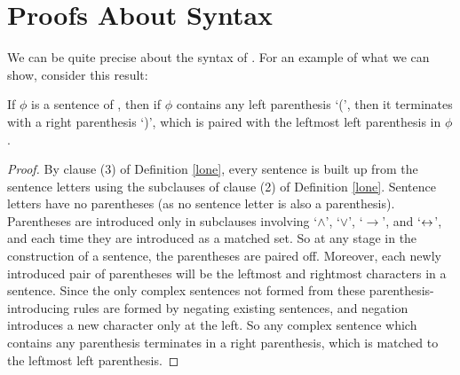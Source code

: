 \section{Proofs About Syntax}


We can be quite precise about the syntax of \lone. For an example of what we can show, consider this result: \begin{theorem}\label{thmpm}	If $\phi$ is a sentence of \lone, then if $\phi$ contains any left parenthesis `(', then it terminates with a right parenthesis `)', which is paired with the leftmost left parenthesis in $\phi$ \citep[\S 2, Theorem 1]{sep-logic-classical}. \begin{proof}
		By clause (3) of Definition \ref{lone}, every sentence is built up from the sentence letters using the subclauses of clause (2) of Definition \ref{lone}. Sentence letters have no parentheses (as no sentence letter is also a parenthesis). Parentheses are introduced only in subclauses involving `$\wedge$', `$\vee$', `$\to$', and `$\leftrightarrow$', and each time they are introduced as a matched set. So at any stage in the construction of a sentence, the parentheses are paired off. Moreover, each newly introduced pair of parentheses will be the leftmost and rightmost characters in a sentence. Since the only complex sentences not formed from these parenthesis-introducing rules are formed by negating existing sentences, and negation introduces a new character only at the left. So any complex sentence which contains any parenthesis terminates in a right parenthesis, which is matched to the leftmost left parenthesis.
	\end{proof}
\end{theorem}
